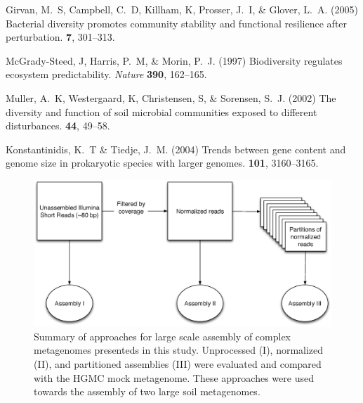 \documentclass{pnastwo}
\begin{document}
\begin{article}
\begin{thebibliography}{10}
 Girvan, M.~S, Campbell, C.~D, Killham, K, Prosser, J.~I,
\& Glover, L.~A. \newblock (2005) {Bacterial diversity promotes community
stability and functional resilience after perturbation.}  {\bf 7}, 301--313.

 McGrady-Steed, J, Harris, P.~M, \& Morin, P.~J.
\newblock (1997) {Biodiversity regulates ecosystem predictability}. \newblock
{\em Nature} {\bf 390}, 162--165.

 Muller, A.~K, Westergaard, K, Christensen, S, \&
Sorensen, S.~J. \newblock (2002) {The diversity and function of soil microbial
communities exposed to different disturbances.}  {\bf 44}, 49--58.

 Konstantinidis, K.~T \& Tiedje, J.~M. \newblock
(2004) {Trends between gene content and genome size in prokaryotic species with
larger genomes}.  {\bf 101}, 3160--3165.

\end{thebibliography} \end{article}

\begin{figure}
\centerline{\includegraphics[width=.7\textwidth]{./figures/new_flowchart.eps}}
\caption{Summary of approaches for large scale assembly of complex metagenomes presenteds in this study.  Unprocessed (I), normalized (II), and partitioned assemblies (III) were evaluated and compared with the HGMC mock metagenome.  These approaches were used towards the assembly of two large soil metagenomes.}
\label{flowchart}
\end{figure}
\end{document}
